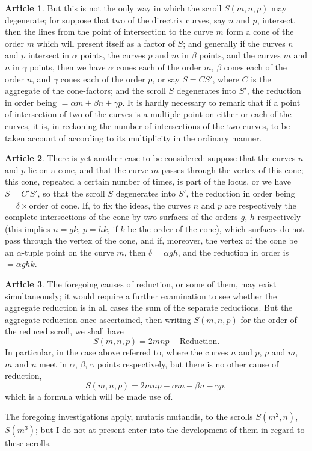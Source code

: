 \documentclass[12pt,a4paper]{article}
\theoremstyle{definition}
\newtheorem{art}{Article}[section]
\begin{document}
\begin{art}
But this is not the only way in which the scroll $S(m, n, p)$ may degenerate; for suppose that two of the directrix curves, say $n$ and $p$, intersect, then the lines from the point of intersection to the curve $m$ form a cone of the order $m$ which will present itself as a factor of $S$; and generally if the curves $n$ and $p$ intersect in $\alpha$ points, the curves $p$ and $m$ in $\beta$ points, and the curves $m$ and $n$ in $\gamma$ points, then we have $\alpha$ cones each of the order $m$, $\beta$ cones each of the order $n$, and $\gamma$ cones each of the order $p$, or say $S = C S'$, where $C$ is the aggregate of the cone-factors; and the scroll $S$ degenerates into $S'$, the reduction in order being $= \alpha m + \beta n + \gamma p$. It is hardly necessary to remark that if a point of intersection of two of the curves is a multiple point on either or each of the curves, it is, in reckoning the number of intersections of the two curves, to be taken account of according to its multiplicity in the ordinary manner.
\end{art}

\begin{art}
There is yet another case to be considered: suppose that the curves $n$ and $p$ lie on a cone, and that the curve $m$ passes through the vertex of this cone; this cone, repeated a certain number of times, is part of the locus, or we have $S = C'S'$, so that the scroll $S$ degenerates into $S'$, the reduction in order being $= \delta \times \text{order of cone}$. If, to fix the ideas, the curves $n$ and $p$ are respectively the complete intersections of the cone by two surfaces of the orders $g$, $h$ respectively (this implies $n = gk$, $p = hk$, if $k$ be the order of the cone), which surfaces do not pass through the vertex of the cone, and if, moreover, the vertex of the cone be an $\alpha$-tuple point on the curve $m$, then $\delta = \alpha gh$, and the reduction in order is $= \alpha ghk$.
\end{art}

\begin{art}
The foregoing causes of reduction, or some of them, may exist simultaneously; it would require a further examination to see whether the aggregate reduction is in all cases the sum of the separate reductions. But the aggregate reduction once ascertained, then writing $S(m, n, p)$ for the order of the reduced scroll, we shall have
\[
S(m, n, p) = 2mnp - \text{Reduction}.
\]
In particular, in the case above referred to, where the curves $n$ and $p$, $p$ and $m$, $m$ and $n$ meet in $\alpha$, $\beta$, $\gamma$ points respectively, but there is no other cause of reduction,
\[
S(m, n, p) = 2mnp - \alpha m - \beta n - \gamma p,
\]
which is a formula which will be made use of.

The foregoing investigations apply, mutatis mutandis, to the scrolls $S(m^2, n)$, $S(m^3)$; but I do not at present enter into the development of them in regard to these scrolls.
\end{art}
\end{document}
